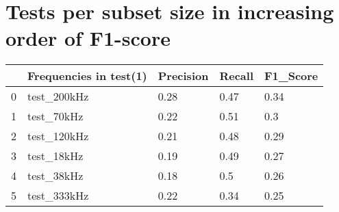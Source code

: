 \section{Tests per subset size in increasing order of F1-score} \label{test_per_freq_f1_appendix}

\begin{longtable}{lllll}
\hline
\multicolumn{1}{|l|}{} & \multicolumn{1}{l|}{Frequencies in test(1)} & \multicolumn{1}{l|}{Precision} & \multicolumn{1}{l|}{Recall} & \multicolumn{1}{l|}{F1\_Score} \\ \hline
\endfirsthead
%
\endhead
%
\hline
\endfoot
%
\endlastfoot
%
0                      & test\_200kHz                                & 0.28                           & 0.47                        & 0.34                           \\
1                      & test\_70kHz                                 & 0.22                           & 0.51                        & 0.3                            \\
2                      & test\_120kHz                                & 0.21                           & 0.48                        & 0.29                           \\
3                      & test\_18kHz                                 & 0.19                           & 0.49                        & 0.27                           \\
4                      & test\_38kHz                                 & 0.18                           & 0.5                         & 0.26                           \\
5                      & test\_333kHz                                & 0.22                           & 0.34                        & 0.25                           \\ \hline
\end{longtable}
